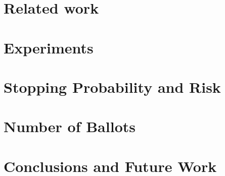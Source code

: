 \documentclass[runningheads]{llncs}
\begin{document}
\section{Related work}
\label{sec:related}


%

\section{Experiments}
\label{sec:expts}


\section{Stopping Probability and Risk}
\label{sec:results1}


\section{Number of Ballots}
\label{sec:results2}


\section{Conclusions and Future Work}
\label{sec:conc}



%
%
%


%
\end{document}
